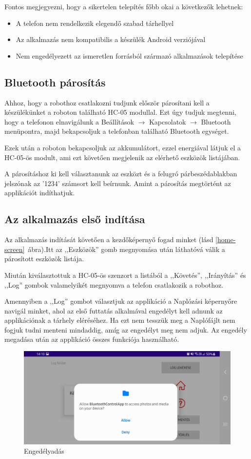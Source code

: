 \documentclass[]{thesis-ekf}
\theoremstyle{definition}
\begin{document}
Fontos megjegyezni, hogy a sikertelen telepítés főbb okai a következők lehetnek:
\begin{itemize}
	\item A telefon nem rendelkezik elegendő szabad tárhellyel
	\item Az alkalmazás nem kompatibilis a készülék Android verziójával
	\item Nem engedélyezett az ismeretlen forrásból származó alkalmazások telepítése
\end{itemize}
\subsection{Bluetooth párosítás}
Ahhoz, hogy a robothoz csatlakozni tudjunk először párosítani kell a készülékünket a roboton található HC-05 modullal. Ezt úgy tudjuk megtenni, hogy a telefonon elnavigálunk a Beállítások $\rightarrow$ Kapcsolatok $\rightarrow$ Bluetooth menüpontra, majd bekapcsoljuk a telefonban található Bluetooth egységet.

Ezek után a roboton bekapcsoljuk az akkumulátort, ezzel energiával látjuk el a HC-05-ös modult, ami ezt követően megjelenik az elérhető eszközök listájában.

A párosításhoz ki kell választanunk az eszközt és a felugró párbeszédablakban jelszónak az '1234' számsort kell beírnunk. Amint a párosítás megtörtént az applikációt indíthatjuk.
\subsection{Az alkalmazás első indítása}
Az alkalmazás indítását követően a kezdőképernyő fogad minket (lásd \ref{home-screen}~ábra).Itt az ,,Eszközök'' gomb megnyomása után láthatóvá válik a párosított eszközök listája.

Miután kiválasztottuk a HC-05-ös szenzort a listából a ,,Követés'', ,,Irányítás'' és ,,Log'' gombok valamelyikét megnyomva a telefon csatlakozik a robothoz.

Amennyiben a ,,Log'' gombot választjuk az applikáció a Naplózási képernyőre navigál minket, ahol az első futtatás alkalmával engedélyt kell adnunk az applikációnak a tárhely eléréséhez. Ha ezt nem tesszük meg a Naplófájlt nem fogjuk tudni menteni mindaddig, amíg az engedélyt meg nem adjuk. Az engedély megadása után az applikáció összes funkciója használható.
\begin{figure}[h]
	\centering
	\includegraphics[width=\columnwidth]{images/app_screen/permission_grant}
	\caption{Engedélyadás}
	\label{grant_permission}
\end{figure}
\end{document}
